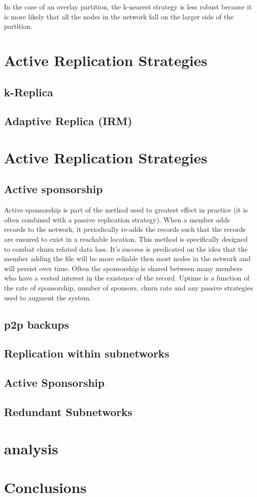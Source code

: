 In the case of an overlay partition, the k-nearest strategy is less robust because it is more likely that all the nodes in the network fall on the larger side of the partition.


  


\section{Active Replication Strategies}


\subsection{k-Replica}
\subsection{Adaptive Replica (IRM)}

\section{Active Replication Strategies}
\subsection{Active sponsorship}
Active sponsorship is part of the method used to greatest effect in practice (it is often combined with a passive replication strategy).
When a member adds records to the network, it periodically re-adds the records such that the records are ensured to exist in a reachable location.
This method is specifically designed to combat churn related data loss.
It's success is predicated on the idea that the member adding the file will be more reliable then most nodes in the network and will persist over time.
Often the sponsorship is shared between many members who have a vested interest in the existence of the record.
Uptime is a function of the rate of sponsorship, number of sponsors, churn rate and any passive strategies used to augment the system.
\subsection{p2p backups}
\subsection{Replication within subnetworks}

\subsection{Active Sponsorship}

\subsection{Redundant Subnetworks}

\section{analysis}

\section{Conclusions}

